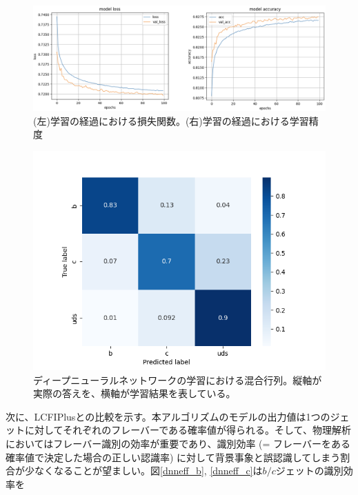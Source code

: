 \begin{figure}[H]
	\begin{center}
 \includegraphics[keepaspectratio, scale=0.3]
 	{Figure/Flavortagging/dnnout.png}
 		\caption{(左)学習の経過における損失関数。(右)学習の経過における学習精度}
 		\label{dnnoutput}
	\end{center}
\end{figure}
\begin{figure}[H]
	\begin{center}
 \includegraphics[keepaspectratio, scale=0.5]
 	{Figure/Flavortagging/dnncm.png}
 		\caption{ディープニューラルネットワークの学習における混合行列。縦軸が実際の答えを、横軸が学習結果を表している。}
 		\label{dnncm}
	\end{center}
\end{figure}
次に、LCFIPlusとの比較を示す。本アルゴリズムのモデルの出力値は1つのジェットに対してそれぞれのフレーバーである確率値が得られる。そして、物理解析においてはフレーバー識別の効率が重要であり、識別効率 (= フレーバーをある確率値で決定した場合の正しい認識率) に対して背景事象と誤認識してしまう割合が少なくなることが望ましい。図\ref{dnneff_b}, \ref{dnneff_c}は$b/c$ジェットの識別効率を
